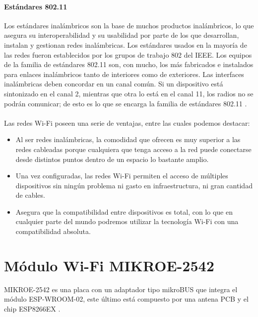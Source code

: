  \paragraph{Estándares 802.11}Los estándares inalámbricos son la base de muchos productos inalámbricos, lo que asegura su interoperabilidad y su usabilidad por parte de los que desarrollan, instalan y gestionan redes inalámbricas. Los estándares usados en la mayoría de las redes fueron establecidos por los grupos de trabajo 802 del IEEE. Los equipos de la familia de estándares 802.11 son, con mucho, los más fabricados e instalados para enlaces inalámbricos tanto de interiores como de exteriores. Las interfaces inalámbricas deben concordar en un canal común. Si un dispositivo está sintonizado en el canal 2, mientras que otra lo está en el canal 11, los radios no se podrán comunicar; de esto es lo que se encarga la familia de estándares 802.11 \citep{MarcoTeoricoWifi}.
\paragraph{}
Las redes Wi-Fi poseen una serie de ventajas, entre las cuales podemos destacar:
\begin{itemize}
	\item Al ser redes inalámbricas, la comodidad que ofrecen es muy superior a las redes cableadas porque cualquiera que tenga acceso a la red puede conectarse desde distintos puntos dentro de un espacio lo bastante amplio.
    \item Una vez configuradas, las redes Wi-Fi permiten el acceso de múltiples dispositivos sin ningún problema ni gasto en infraestructura, ni gran cantidad de cables.
    \item Asegura que la compatibilidad entre dispositivos es total, con lo que en cualquier parte del mundo podremos utilizar la tecnología Wi-Fi con una compatibilidad absoluta. 
\end{itemize}
 
 
 
\section{Módulo Wi-Fi MIKROE-2542}

MIKROE-2542 es una placa con un adaptador tipo mikroBUS que integra el módulo ESP-WROOM-02, este último está compuesto por una antena PCB y el chip ESP8266EX \citep{MarcoTeorico5}.


